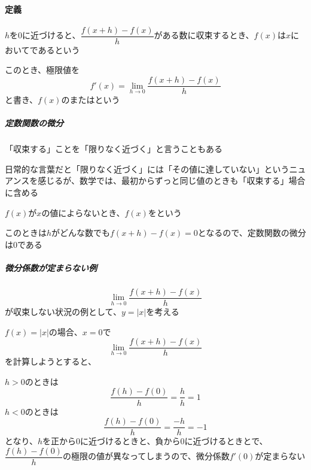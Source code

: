 \documentclass[../book_jiriki_calc]{subfiles}
\begin{document}
\sectionline

\paragraph{定義}

$h$を$0$に近づけると、$\dfrac{f(x+h)-f(x)}{h}$がある数に収束するとき、$f(x)$は$x$においてであるという

このとき、極限値を
\begin{equation}
  f'(x) = \lim_{h \to 0} \dfrac{f(x+h)-f(x)}{h}
\end{equation}
と書き、$f(x)$のまたはという

\sectionline

\subparagraph{定数関数の微分}

「収束する」ことを「限りなく近づく」と言うこともある

日常的な言葉だと「限りなく近づく」には「その値に達していない」というニュアンスを感じるが、数学では、最初からずっと同じ値のときも「収束する」場合に含める

\br

$f(x)$が$x$の値によらないとき、$f(x)$をという

このときは$h$がどんな数でも$f(x+h)-f(x)=0$となるので、定数関数の微分は$0$である

\sectionline

\subparagraph{微分係数が定まらない例}

\begin{equation}
  \lim_{h\to 0}\dfrac{f(x+h)-f(x)}{h}
\end{equation}
が収束しない状況の例として、$y=\left|x\right|$を考える

$f(x)=|x|$の場合、$x=0$で
\begin{equation}
  \lim_{h\to 0}\dfrac{f(x+h)-f(x)}{h}
\end{equation}
を計算しようとすると、

$h>0$のときは
\begin{equation}
  \dfrac{f(h)-f(0)}{h} = \dfrac{h}{h} = 1
\end{equation}
$h<0$のときは
\begin{equation}
  \dfrac{f(h)-f(0)}{h} = \dfrac{-h}{h} = -1
\end{equation}
となり、$h$を正から$0$に近づけるときと、負から$0$に近づけるときとで、$\dfrac{f(h)-f(0)}{h}$の極限の値が異なってしまうので、微分係数$f'(0)$が定まらない

\sectionline
\end{document}
